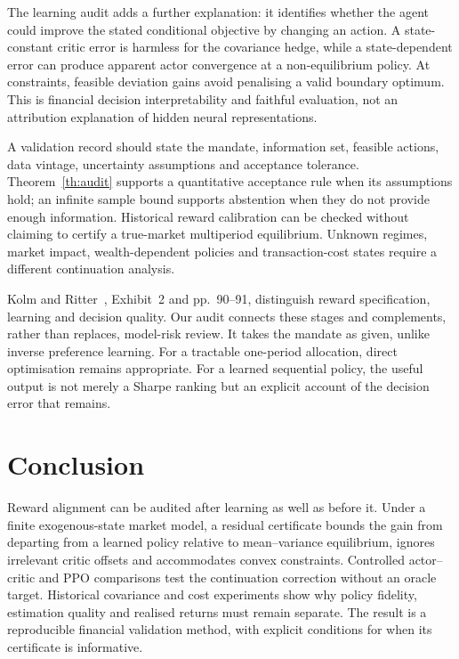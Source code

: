\documentclass[sigconf,anonymous,review]{acmart}
\begin{document}
The learning audit adds a further explanation: it identifies whether the agent could improve the stated conditional objective by changing an action. A state-constant critic error is harmless for the covariance hedge, while a state-dependent error can produce apparent actor convergence at a non-equilibrium policy. At constraints, feasible deviation gains avoid penalising a valid boundary optimum. This is financial decision interpretability and faithful evaluation, not an attribution explanation of hidden neural representations.

A validation record should state the mandate, information set, feasible actions, data vintage, uncertainty assumptions and acceptance tolerance. Theorem~\ref{th:audit} supports a quantitative acceptance rule when its assumptions hold; an infinite sample bound supports abstention when they do not provide enough information. Historical reward calibration can be checked without claiming to certify a true-market multiperiod equilibrium. Unknown regimes, market impact, wealth-dependent policies and transaction-cost states require a different continuation analysis.

Kolm and Ritter~\cite{kolm2025}, Exhibit~2 and pp.~90--91, distinguish reward specification, learning and decision quality. Our audit connects these stages and complements, rather than replaces, model-risk review. It takes the mandate as given, unlike inverse preference learning. For a tractable one-period allocation, direct optimisation remains appropriate. For a learned sequential policy, the useful output is not merely a Sharpe ranking but an explicit account of the decision error that remains.

\section{Conclusion}
Reward alignment can be audited after learning as well as before it. Under a finite exogenous-state market model, a residual certificate bounds the gain from departing from a learned policy relative to mean--variance equilibrium, ignores irrelevant critic offsets and accommodates convex constraints. Controlled actor--critic and PPO comparisons test the continuation correction without an oracle target. Historical covariance and cost experiments show why policy fidelity, estimation quality and realised returns must remain separate. The result is a reproducible financial validation method, with explicit conditions for when its certificate is informative.
\end{document}
